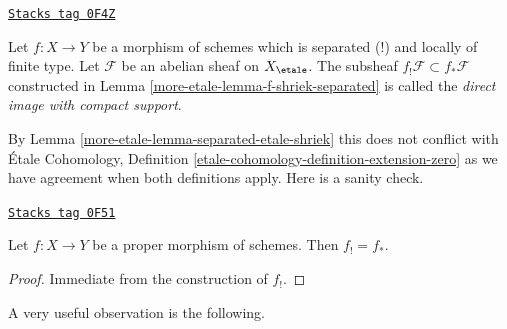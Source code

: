 \begin{definition}
\label{more-etale-definition-f-shriek-separated}
\href{https://stacks.math.columbia.edu/tag/0F4Z}{\texttt{Stacks tag 0F4Z}}

Let $f : X \to Y$ be a morphism of schemes which is separated (!) and
locally of finite type. Let $\mathcal{F}$ be an abelian sheaf on
$X_\etale$. The subsheaf $f_!\mathcal{F} \subset f_*\mathcal{F}$
constructed in Lemma \ref{more-etale-lemma-f-shriek-separated} is called the
{\it direct image with compact support}.
\end{definition}

By Lemma \ref{more-etale-lemma-separated-etale-shriek} this does not conflict with
\'Etale Cohomology, Definition \ref{etale-cohomology-definition-extension-zero}
as we have agreement when both definitions apply. Here is a sanity check.

\begin{lemma}
\label{more-etale-lemma-proper-f-shriek}
\href{https://stacks.math.columbia.edu/tag/0F51}{\texttt{Stacks tag 0F51}}

Let $f : X \to Y$ be a proper morphism of schemes.
Then $f_! = f_*$.
\end{lemma}

\begin{proof}
Immediate from the construction of $f_!$.
\end{proof}

A very useful observation is the following.

